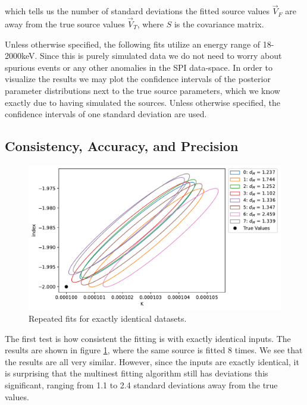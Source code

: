 \documentclass{report}
\begin{document}
which tells us the number of standard deviations the fitted source values $\vec{V}_F$ are away from the true source values $\vec{V}_T$, where $S$ is the covariance matrix.

Unless otherwise specified, the following fits utilize an energy range of 18-2000keV. Since this is purely simulated data we do not need to worry about spurious events or any other anomalies in the SPI data-space. In order to visualize the results we may plot the confidence intervals of the posterior parameter distributions next to the true source parameters, which we know exactly due to having simulated the sources. Unless otherwise specified, the confidence intervals of one standard deviation are used.

\subsection{Consistency, Accuracy, and Precision}

\begin{figure}[h]
  \centering
  \includegraphics[width=\textwidth]{Images/Pure_Simulation/combined_plot_repeated_identical.pdf}
  \caption{Repeated fits for exactly identical datasets.}
  \label{fig ident}
\end{figure}

The first test is how consistent the fitting is with exactly identical inputs. The results are shown in figure \ref{fig ident}, where the same source is fitted 8 times. We see that the results are all very similar. However, since the inputs are exactly identical, it is surprising that the multinest fitting algorithm still has deviations this significant, ranging from 1.1 to 2.4 standard deviations away from the true values. 
\end{document}
